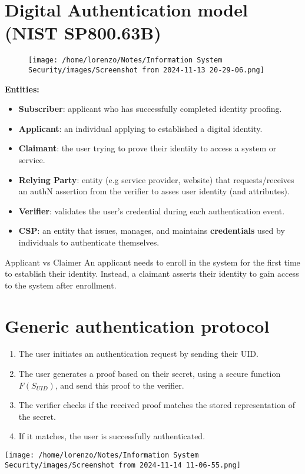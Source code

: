 \section{Digital Authentication model (NIST SP800.63B)}
\begin{figure}[H]
    \centering
    \texttt{[image: /home/lorenzo/Notes/Information System Security/images/Screenshot from 2024-11-13 20-29-06.png]}
\end{figure}
\textbf{Entities:}
\begin{itemize}
    \item \textbf{Subscriber}: applicant who has successfully completed identity proofing.
    \item \textbf{Applicant}: an individual applying to established a digital identity.
    \item \textbf{Claimant}: the user trying to prove their identity to access a system or service.
    \item \textbf{Relying Party}: entity (e.g service provider, website) that requests/receives an authN assertion from the verifier to asses user identity (and attributes).
    \item \textbf{Verifier}: validates the user's credential during each authentication event. 
    \item \textbf{CSP}: an entity that issues, manages, and maintains \textbf{credentials} used by individuals to authenticate themselves. 
\end{itemize}
\begin{quotebox-red}{Applicant vs Claimer}
    An applicant needs to enroll in the system for the first time to establish their identity. Instead, a claimant asserts their identity to gain access to the system after enrollment.
\end{quotebox-red}


\section{Generic authentication protocol}
\begin{minipage}{0.5\textwidth}
    \begin{enumerate}
        \item The user initiates an authentication request by sending their UID.
        \item The user generates a proof based on their secret, using a secure function \(F(S_{UID})\), and send this proof to the verifier.
        \item The verifier checks if the received proof matches the stored representation of the secret.
        \item If it matches, the user is successfully authenticated.
    \end{enumerate}
\end{minipage} 
\hspace{1cm}
\begin{minipage}{0.5\textwidth}
    \centering
    \texttt{[image: /home/lorenzo/Notes/Information System Security/images/Screenshot from 2024-11-14 11-06-55.png]}
\end{minipage}



